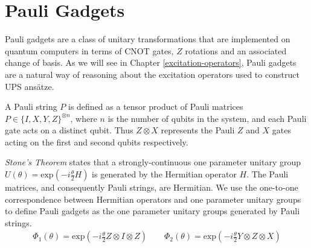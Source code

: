 \chapter{Pauli Gadgets}%
\label{pauli-gadgets}

Pauli gadgets are a class of unitary transformations that are implemented on quantum computers in terms of CNOT gates, $Z$ rotations and an associated change of basis. As we will see in Chapter \ref{excitation-operators}, Pauli gadgets are a natural way of reasoning about the excitation operators used to construct UPS ansätze.

A Pauli string $P$ is defined as a tensor product of Pauli matrices $P \in \{I, X, Y, Z\}^{\otimes n}$, where $n$ is the number of qubits in the system, and each Pauli gate acts on a distinct qubit. Thus $Z \otimes X$ represents the Pauli $Z$ and $X$ gates acting on the first and second qubits respectively.

\textit{Stone's Theorem} \cite{Stone1932} states that a strongly-continuous one parameter unitary group $U(\theta) = \text{exp} \left(- i \frac{\theta}{2} H \right)$ is generated by the Hermitian operator $H$. The Pauli matrices, and consequently Pauli strings, are Hermitian. We use the one-to-one correspondence between Hermitian operators and one parameter unitary groups to define Pauli gadgets as the one parameter unitary groups generated by Pauli strings.
\begin{gather*}
    \Phi_1(\theta) = \text{exp}\left(- i \frac{\theta}{2} Z \otimes I \otimes Z \right) \qquad
    \Phi_2(\theta) = \text{exp}\left(- i \frac{\theta}{2} Y \otimes Z \otimes X \right)%
\end{gather*}
